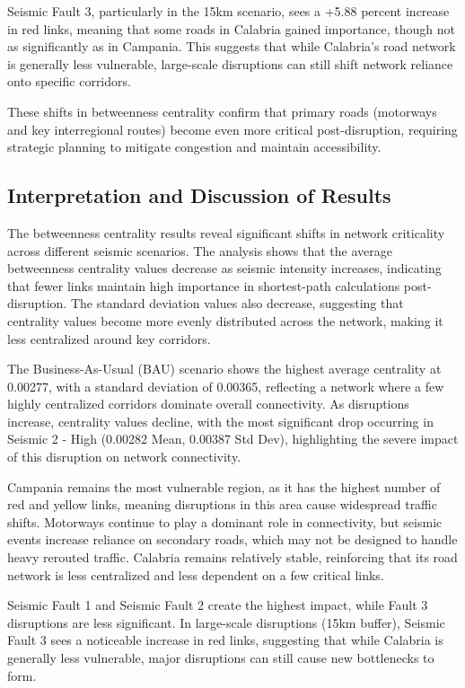 Seismic Fault 3, particularly in the 15km scenario, sees a +5.88 percent increase in red links, meaning that some roads in Calabria gained importance, though not as significantly as in Campania. This suggests that while Calabria’s road network is generally less vulnerable, large-scale disruptions can still shift network reliance onto specific corridors.

These shifts in betweenness centrality confirm that primary roads (motorways and key interregional routes) become even more critical post-disruption, requiring strategic planning to mitigate congestion and maintain accessibility.

\subsection{Interpretation and Discussion of Results}
The betweenness centrality results reveal significant shifts in network criticality across different seismic scenarios. The analysis shows that the average betweenness centrality values decrease as seismic intensity increases, indicating that fewer links maintain high importance in shortest-path calculations post-disruption. The standard deviation values also decrease, suggesting that centrality values become more evenly distributed across the network, making it less centralized around key corridors.

The Business-As-Usual (BAU) scenario shows the highest average centrality at 0.00277, with a standard deviation of 0.00365, reflecting a network where a few highly centralized corridors dominate overall connectivity. As disruptions increase, centrality values decline, with the most significant drop occurring in Seismic 2 - High (0.00282 Mean, 0.00387 Std Dev), highlighting the severe impact of this disruption on network connectivity.

Campania remains the most vulnerable region, as it has the highest number of red and yellow links, meaning disruptions in this area cause widespread traffic shifts. Motorways continue to play a dominant role in connectivity, but seismic events increase reliance on secondary roads, which may not be designed to handle heavy rerouted traffic. Calabria remains relatively stable, reinforcing that its road network is less centralized and less dependent on a few critical links.

Seismic Fault 1 and Seismic Fault 2 create the highest impact, while Fault 3 disruptions are less significant. In large-scale disruptions (15km buffer), Seismic Fault 3 sees a noticeable increase in red links, suggesting that while Calabria is generally less vulnerable, major disruptions can still cause new bottlenecks to form.

